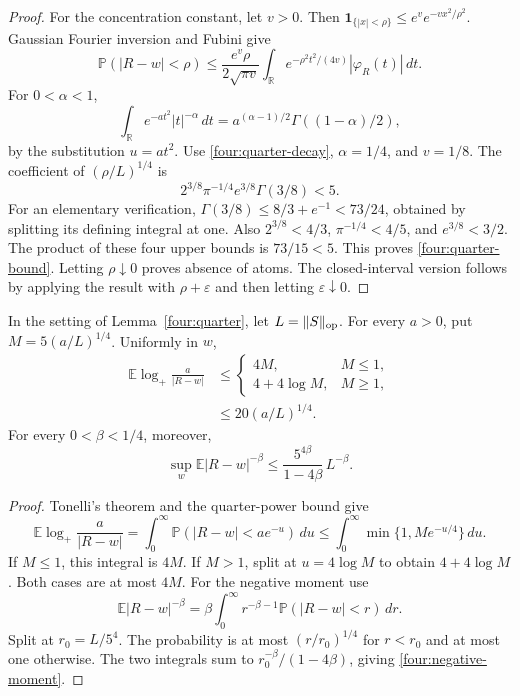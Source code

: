 \begin{proof}
For the concentration constant, let \(v>0\).  Then
\(\mathbf1_{\{|x|<\rho\}}\leq e^v e^{-vx^2/\rho^2}\).
Gaussian Fourier inversion and Fubini give
\[
 \mathbb P(|R-w|<\rho)
 \leq\frac{e^v\rho}{2\sqrt{\pi v}}
      \int_{\mathbb R}e^{-\rho^2t^2/(4v)}
                         |\varphi_R(t)|\,dt.
\]
For \(0<\alpha<1\),
\[
 \int_{\mathbb R}e^{-at^2}|t|^{-\alpha}\,dt
 =a^{(\alpha-1)/2}\Gamma((1-\alpha)/2),
\]
by the substitution \(u=at^2\).
Use \eqref{four:quarter-decay}, \(\alpha=1/4\), and \(v=1/8\).
The coefficient of \((\rho/L)^{1/4}\) is
\[
 2^{3/8}\pi^{-1/4}e^{3/8}\Gamma(3/8)<5.
\]
For an elementary verification,
\(\Gamma(3/8)\leq8/3+e^{-1}<73/24\), obtained by splitting
its defining integral at one.  Also
\(2^{3/8}<4/3\), \(\pi^{-1/4}<4/5\), and \(e^{3/8}<3/2\).
The product of these four upper bounds is \(73/15<5\).
This proves \eqref{four:quarter-bound}.
Letting \(\rho\downarrow0\) proves absence of atoms.
The closed-interval version follows by applying the result with
\(\rho+\varepsilon\) and then letting \(\varepsilon\downarrow0\).
\end{proof}

\begin{corollary}
\label{four:log-potential}
In the setting of Lemma~\ref{four:quarter}, let
\(L=\|S\|_{\rm op}\).  For every \(a>0\), put
\(M=5(a/L)^{1/4}\).  Uniformly in \(w\),
\begin{align}
 \mathbb E\log_+\frac a{|R-w|}
 &\leq
 \begin{cases}
  4M,&M\leq1,\\
  4+4\log M,&M\geq1,
 \end{cases}
 \label{four:log-potential-bound}\\
 &\leq20(a/L)^{1/4}.
 \nonumber
\end{align}
For every \(0<\beta<1/4\), moreover,
\begin{equation}\label{four:negative-moment}
 \sup_w\mathbb E|R-w|^{-\beta}
 \leq\frac{5^{4\beta}}{1-4\beta}\,L^{-\beta}.
\end{equation}
\end{corollary}
\begin{proof}
Tonelli's theorem and the quarter-power bound give
\[
 \mathbb E\log_+\frac a{|R-w|}
 =\int_0^\infty
      \mathbb P(|R-w|<ae^{-u})\,du
 \leq\int_0^\infty\min\{1,Me^{-u/4}\}\,du.
\]
If \(M\leq1\), this integral is \(4M\).
If \(M>1\), split at \(u=4\log M\) to obtain \(4+4\log M\).
Both cases are at most \(4M\).
For the negative moment use
\[
 \mathbb E|R-w|^{-\beta}
 =\beta\int_0^\infty r^{-\beta-1}
                       \mathbb P(|R-w|<r)\,dr.
\]
Split at \(r_0=L/5^4\).  The probability is at most
\((r/r_0)^{1/4}\) for \(r<r_0\) and at most one otherwise.
The two integrals sum to
\(r_0^{-\beta}/(1-4\beta)\), giving
\eqref{four:negative-moment}.
\end{proof}

